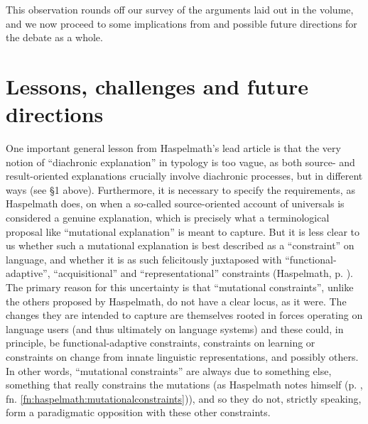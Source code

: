 \documentclass[output=paper]{langsci/langscibook}
\begin{document}
This observation rounds off our survey of the arguments laid out in the volume, and we now proceed to some implications from and possible future directions for the debate as a whole.

\section{Lessons, challenges and future directions}

One important general lesson from Haspelmath’s lead article is that the very notion of “diachronic explanation” in typology is too vague, as both source- and result-oriented explanations crucially involve diachronic processes, but in different ways (see §1 above). Furthermore, it is necessary to specify the requirements, as Haspelmath does, on when a so-called source-oriented account of universals is considered a genuine explanation, which is precisely what a terminological proposal like “mutational explanation” is meant to capture. But it is less clear to us whether such a mutational explanation is best described as a “constraint” on language, and whether it is as such felicitously juxtaposed with “functional-adaptive”, “acquisitional” and “representational” constraints (Haspelmath, p. \pageref{p:haspelmath:representationalconstraints}). The primary reason for this uncertainty is that “mutational constraints”, unlike the others proposed by Haspelmath, do not have a clear locus, as it were. The changes they are intended to capture are themselves rooted in forces operating on language users (and thus ultimately on language systems) and these could, in principle, be functional-adaptive constraints, constraints on learning or constraints on change from innate linguistic representations, and possibly others. In other words, “mutational constraints” are always due to something else, something that really constrains the mutations (as Haspelmath notes himself (p. \pageref{fn:haspelmath:mutationalconstraints}, fn. \ref{fn:haspelmath:mutationalconstraints})), and so they do not, strictly speaking, form a paradigmatic opposition with these other constraints.
\end{document}
